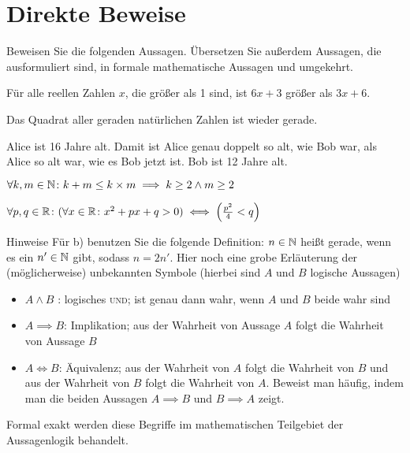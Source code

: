 \documentclass{scrartcl}
\begin{document}
\maketitle

\section{Direkte Beweise }
Beweisen Sie die folgenden Aussagen. 
Übersetzen Sie außerdem Aussagen, die ausformuliert sind, in formale mathematische Aussagen und umgekehrt.
\begin{subex}
  \item{} Für alle reellen Zahlen $x$, die größer als 1 sind, ist $6x + 3$ größer als $3x + 6$.
  \item{} Das Quadrat aller geraden natürlichen Zahlen ist wieder gerade.
  \item{} Alice ist 16 Jahre alt. Damit ist Alice genau doppelt so alt, wie Bob war, als Alice so alt war, wie es Bob jetzt ist. Bob ist 12 Jahre alt.
  \item{} $\forall k, m \in \mathbb{N}\colon k + m \le k \times m \implies k \ge 2 \land m \ge 2$
  \item{} $\forall p, q \in \mathbb{R}\colon (\forall x \in \mathbb{R}\colon x^2 + px + q > 0) \iff \left( \frac{p^2}{4} < q \right)$ 
\end{subex}

\begin{remark}{Hinweise}
  Für b) benutzen Sie die folgende Definition: $n \in \mathbb{N}$ heißt gerade, wenn es ein $n' \in \mathbb{N}$ gibt, sodass $n = 2n'$. Hier noch eine grobe Erläuterung der (möglicherweise) unbekannten Symbole (hierbei sind $A$ und $B$ logische Aussagen)
  \begin{itemize}
    \item $A \land B$ : logisches \textsc{und}; ist genau dann wahr, wenn $A$ und $B$ beide wahr sind
    \item $A \implies B$: Implikation; aus der Wahrheit von Aussage $A$ folgt die Wahrheit von Aussage $B$
    \item $A \iff B$: Äquivalenz; aus der Wahrheit von $A$ folgt die Wahrheit von $B$ und aus der Wahrheit von $B$ folgt die Wahrheit von $A$. 
    Beweist man häufig, indem man die beiden Aussagen $A \implies B$ und $B \implies A$ zeigt.
  \end{itemize}
  Formal exakt werden diese Begriffe im mathematischen Teilgebiet der Aussagenlogik behandelt.
\end{remark}
\end{document}
